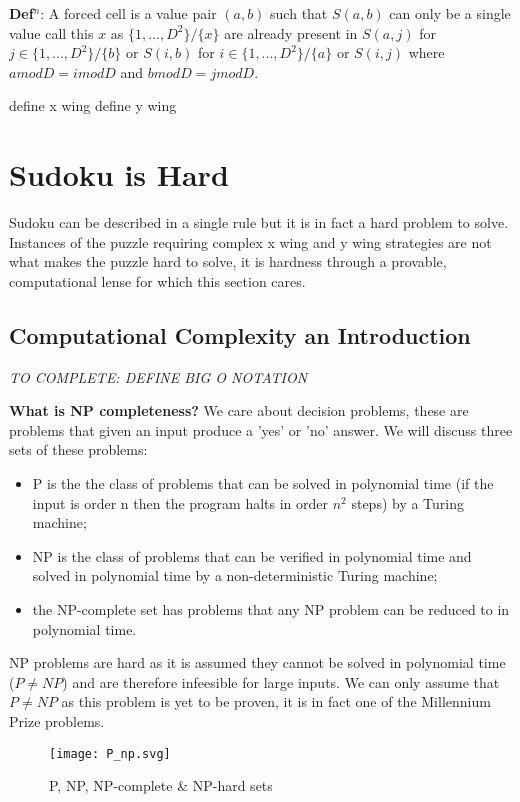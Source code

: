 \documentclass[a4paper,12pt]{article}
\begin{document}
\textbf{Def$^n$}: A forced cell is a value pair $(a,b)$ such that $S(a,b)$ can only be a single value call this $x$ as $\{1,...,D^2\}/\{x\}$ are already present in $S(a,j)$ for $j \in\{1,...,D^2\}/\{b\}$ or $S(i,b)$ for $i \in\{1,...,D^2\}/\{a\}$ or $S(i,j)$ where $a mod D = i mod D$ and $b mod D  =  j mod D$.

define x wing
define y wing
\section{Sudoku is Hard}

Sudoku can be described in a single rule but it is in fact a hard problem to solve. Instances of the puzzle requiring complex x wing and y wing strategies are not what makes the puzzle hard to solve, it is hardness through a provable, computational lense for which this section cares. 
		
\subsection{Computational Complexity an Introduction}
	
	 \textit{TO COMPLETE: DEFINE BIG O NOTATION}
	 
\textbf{What is NP completeness?}
We care about decision problems, these are problems that given an input  produce a 'yes' or 'no' answer. We will discuss three sets of these problems: 
\begin{itemize}
	\item{P is the the class of problems that can be solved in polynomial time (if the input is order n then the program halts in order $n^2$ steps) by a Turing machine;} 
	\item{NP is the class of problems that can be verified in polynomial time and solved in polynomial time by a non-deterministic Turing machine;} 
	\item{the NP-complete set has problems that any NP problem can be reduced to in polynomial time.} 
\end{itemize}

NP problems are hard as it is assumed they cannot be solved in polynomial time ($P \neq NP$) and are therefore infeesible for large inputs. We can only assume that $P\neq NP$ as this problem is yet to be proven, it is in fact one of the Millennium Prize problems.

\begin{figure}[h!]
	\begin{center}
		\texttt{[image: P\_np.svg]}
	\end{center}
	\caption{P, NP, NP-complete \& NP-hard sets \cite{P_NP_Figure}}
\end{figure}
\end{document}

